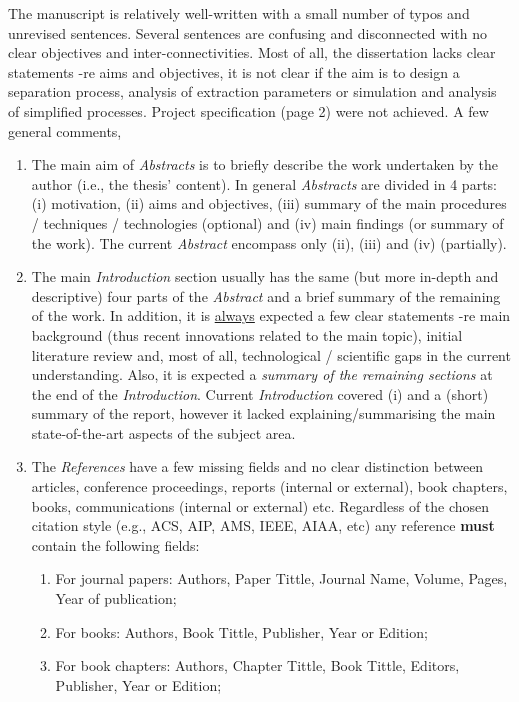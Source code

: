 \documentclass[14pt,twoside]{report}
\begin{document}
The manuscript is relatively well-written with a small number of typos and unrevised sentences. Several sentences are confusing and disconnected with no clear objectives and inter-connectivities.  Most of all, the dissertation lacks clear statements -re aims and objectives, it is not clear if the aim is to design a separation process, analysis of extraction parameters or simulation and analysis of simplified processes. Project specification (page 2) were not achieved. A few general comments,
\begin{enumerate}
%
\item The main aim of {\it Abstracts} is to briefly describe the work undertaken by the author (i.e., the thesis' content). In general {\it Abstracts} are divided in 4 parts: (i) motivation, (ii) aims and objectives, (iii) summary of the main procedures / techniques / technologies (optional) and (iv) main findings (or summary of the work). The current {\it Abstract} encompass only (ii), (iii) and (iv) (partially).
%
\item The main {\it Introduction} section usually has the same (but more in-depth and descriptive) four parts of the {\it Abstract} and a brief summary of the remaining of the work. In addition, it is \underline{always} expected a few clear statements -re main background (thus recent innovations related to the main topic), initial literature review and, most of all, technological / scientific gaps in the current understanding. Also, it is expected a {\it summary of the remaining sections} at the end of the {\it Introduction}.  Current {\it Introduction} covered (i) and a (short) summary of the report, however it lacked explaining/summarising the main state-of-the-art aspects of the subject area.
%
\item The {\it References} have a few missing fields and no clear distinction between articles, conference proceedings, reports (internal or external), book chapters, books, communications (internal or external) etc.  Regardless of the chosen citation style (e.g., ACS, AIP, AMS, IEEE, AIAA, etc) any reference {\bf must} contain the following fields: 
\begin{enumerate}
\item For journal papers: Authors, Paper Tittle, Journal Name, Volume, Pages, Year of publication;
\item For books: Authors, Book Tittle, Publisher, Year or Edition;
\item For book chapters: Authors, Chapter Tittle, Book Tittle, Editors, Publisher, Year or Edition;

\end{enumerate}
\end{enumerate}
\end{document}
